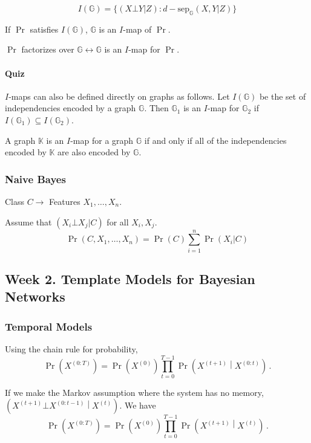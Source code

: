 \documentclass[12pt]{article}
\begin{document}
\begin{equation*}
  I(\mathbb{G}) = \{ (X \bot Y | Z) : d-\text{sep}_{\mathbb{G}}(X, Y|Z) \}
\end{equation*}

If $\Pr$ satisfies $I(\mathbb{G})$, $\mathbb{G}$ is an $I$-map of $\Pr$.

$\Pr$ factorizes over $\mathbb{G} \leftrightarrow \mathbb{G}$ is an $I$-map for $\Pr$.

\paragraph{Quiz}

$I$-maps can also be defined directly on graphs as follows. Let $I(\mathbb{G})$ be the set of independencies encoded by a graph $\mathbb{G}$. Then $\mathbb{G}_1$ is an $I$-map for $\mathbb{G}_2$ if $I(\mathbb{G}_1) \subseteq I(\mathbb{G}_2)$.

A graph $\mathbb{K}$ is an $I$-map for a graph $\mathbb{G}$ if and only if all of the independencies encoded by $\mathbb{K}$ are also encoded by $\mathbb{G}$.

\subsubsection{Naive Bayes}

Class $C \rightarrow$ Features $X_1, \ldots, X_n$.

Assume that $(X_i \bot X_j | C)$ for all $X_i, X_j$.
\begin{equation*}
  \Pr(C, X_1, \ldots, X_n) = \Pr(C) \sum_{i=1}^n \Pr(X_i | C)
\end{equation*}



\subsection{Week 2. Template Models for Bayesian Networks}

\subsubsection{Temporal Models}

Using the chain rule for probability,
\begin{equation*}
  \Pr(X^{(0:T)}) = \Pr(X^{(0)}) \prod_{t=0}^{T-1} \Pr\left(X^{(t+1)} \middle\vert X^{(0:t)} \right) \, .
\end{equation*}

If we make the Markov assumption where the system has no memory, $\left( X^{(t+1)} \bot X^{(0:t-1)} \middle\vert X^{(t)}\right)$.
We have
\begin{equation*}
  \Pr(X^{(0:T)}) = \Pr(X^{(0)}) \prod_{t=0}^{T-1} \Pr\left(X^{(t+1)} \middle\vert X^{(t)} \right) \, .
\end{equation*}
\end{document}
